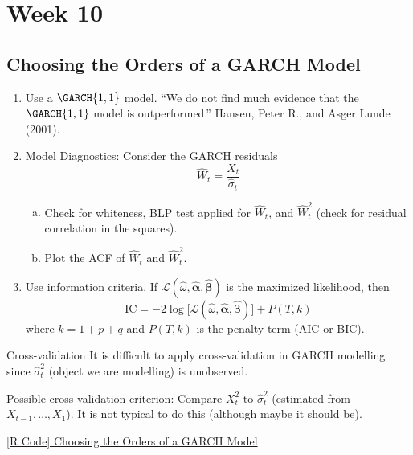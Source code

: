 \chapter{Week 10}
\section{Choosing the Orders of a GARCH Model}
\begin{enumerate}[(1)]
    \item Use a $ \GARCH{1,1} $ model. ``We do not find much evidence
          that the $ \GARCH{1,1} $ model is outperformed.'' Hansen, Peter R., and Asger Lunde (2001).
    \item Model Diagnostics: Consider the GARCH residuals
          \[ \hat{W}_t=\frac{X_t}{\hat{\sigma}_t}  \]
          \begin{enumerate}[(a)]
              \item Check for whiteness, BLP test applied for $ \hat{W}_t $,
                    and $ \hat{W}_t^2 $ (check for residual correlation in the squares).
              \item Plot the ACF of $ \hat{W}_t $ and $ \hat{W}_t^2 $.
          \end{enumerate}
    \item Use information criteria. If $ \mathcal{L}(\hat{\omega},\hat{\symbf{\alpha}},\hat{\symbf{\beta}}) $
          is the maximized likelihood, then
          \[ \text{IC}=-2\log\bigl[\mathcal{L}(\hat{\omega},\hat{\symbf{\alpha}},\hat{\symbf{\beta}})\bigr]+P(T,k) \]
          where $ k=1+p+q $ and $ P(T,k) $ is the penalty term (AIC or BIC).
\end{enumerate}
\begin{Remark}{Cross-validation}{}
    It is difficult to apply cross-validation in GARCH modelling since
    $ \hat{\sigma}_t^2 $ (object we are modelling) is unobserved.

    \vspace{1mm}

    Possible cross-validation criterion: Compare $ X_t^2 $ to $ \hat{\sigma}_t^2 $
    (estimated from $ X_{t-1},\ldots,X_1 $). It is
    not typical to do this (although maybe it should be).
\end{Remark}
\href{https://github.com/Hextical/university-notes/blob/master/year-3/semester-2/STAT%20443/code/10.1%20-%20Choosing%20the%20Orders%20of%20a%20GARCH%20Model.R}{[R Code] Choosing the Orders of a GARCH Model}
